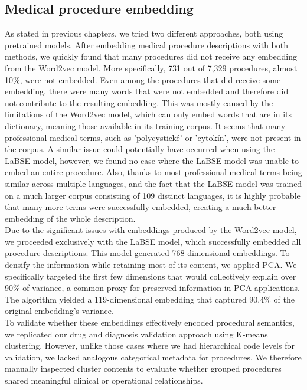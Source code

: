 \subsection{Medical procedure embedding}

As stated in previous chapters, we tried two different approaches, both using pretrained models. After embedding medical procedure descriptions with both methods, we quickly found that many procedures did not receive any embedding from the Word2vec model. More specifically, 731 out of 7,329 procedures, almost 10\%, were not embedded. Even among the procedures that did receive some embedding, there were many words that were not embedded and therefore did not contribute to the resulting embedding. This was mostly caused by the limitations of the Word2vec model, which can only embed words that are in its dictionary, meaning those available in its training corpus. It seems that many professional medical terms, such as 'polycystické' or 'cytokín', were not present in the corpus. A similar issue could potentially have occurred when using the LaBSE model, however, we found no case where the LaBSE model was unable to embed an entire procedure. Also, thanks to most professional medical terms being similar across multiple languages, and the fact that the LaBSE model was trained on a much larger corpus consisting of 109 distinct languages, it is highly probable that many more terms were successfully embedded, creating a much better embedding of the whole description.
\\

Due to the significant issues with embeddings produced by the Word2vec model, we proceeded exclusively with the LaBSE model, which successfully embedded all procedure descriptions. This model generated 768-dimensional embeddings. To densify the information while retaining most of its content, we applied PCA. We specifically targeted the first few dimensions that would collectively explain over 90\% of variance, a common proxy for preserved information in PCA applications. The algorithm yielded a 119-dimensional embedding that captured 90.4\% of the original embedding's variance.
\\

To validate whether these embeddings effectively encoded procedural semantics, we replicated our drug and diagnosis validation approach using K-means clustering. However, unlike those cases where we had hierarchical code levels for validation, we lacked analogous categorical metadata for procedures. We therefore manually inspected cluster contents to evaluate whether grouped procedures shared meaningful clinical or operational relationships.
\\

